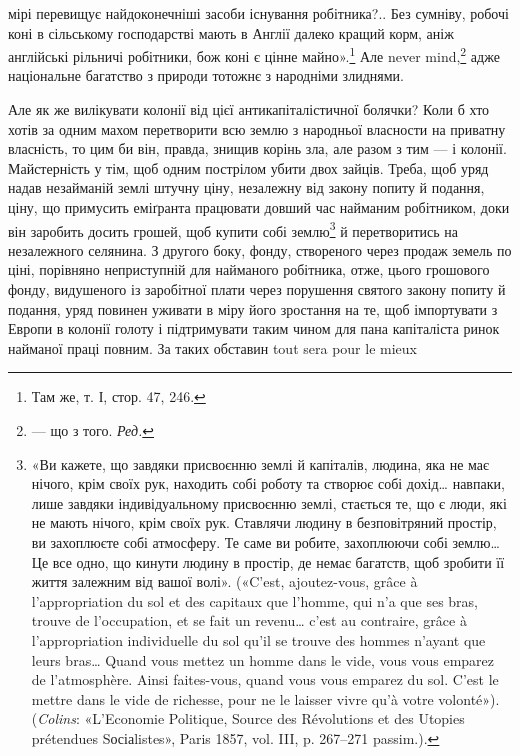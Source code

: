 \parcont{}  %
мірі перевищує найдоконечніші засоби існування робітника?.. Без сумніву, робочі коні в сільському
господарстві мають в Англії далеко кращий корм, аніж англійські рільничі робітники, бож коні є цінне
майно».\footnote{
Там же, т. І, стор. 47, 246.
} Але never mind,\footnote*{— що з того. \emph{Ред.}} адже національне багатство з природи тотожнє з народніми злиднями.

Але як же вилікувати колонії від цієї антикапіталістичної болячки? Коли б хто хотів за одним махом
перетворити всю землю з народньої власности на приватну власність, то цим би він, правда, знищив
корінь зла, але разом з тим — і колонії. Майстерність у тім, щоб одним пострілом убити двох зайців.
Треба, щоб уряд надав незайманій землі штучну ціну, незалежну від закону попиту й подання, ціну, що
примусить еміґранта
працювати довший час найманим робітником, доки він заробить досить грошей, щоб купити собі землю\footnote{
«Ви кажете, що завдяки присвоєнню землі й капіталів, людина, яка не має нічого, крім своїх рук,
находить собі роботу та створює собі дохід\dots{} навпаки, лише завдяки індивідуальному присвоєнню
землі, стається те, що є люди, які не мають нічого, крім своїх рук. Ставлячи людину в безповітряний
простір, ви захоплюєте собі атмосферу. Те саме ви робите, захоплюючи собі землю\dots{} Це все одно, що
кинути людину в простір, де немає багатств, щоб зробити її життя залежним від вашої волі». («C’est,
ajoutez-vous, grâce à l’appropriation du sol et des capitaux que l’homme, qui n’a que ses bras,
trouve de l’occupation, et se fait un revenu\dots{} c’est au contraire, grâce à l’appropriation
individuelle du
sol qu’il se trouve des hommes n’ayant que leurs bras\dots{} Quand vous mettez un homme dans le vide,
vous vous emparez de l’atmosphère. Ainsi faites-vous, quand vous vous emparez du sol. C’est le
mettre dans le vide de richesse, pour ne le laisser vivre qu’à votre volonté»). (\emph{Colins}: «L’Economie
Politique, Source des Révolutions et des Utopies prétendues Sосіаlistes», Paris 1857, vol. III, p.
267--271 passim.).
} й перетворитись на незалежного селянина. З другого боку, фонду, створеного через продаж земель по
ціні, порівняно неприступній для найманого робітника, отже, цього грошового фонду, видушеного із
заробітної плати через порушення святого закону попиту й подання, уряд повинен уживати в міру його
зростання на те, щоб імпортувати з Европи в колонії голоту і підтримувати таким
чином для пана капіталіста ринок найманої праці повним. За таких обставин tout sera pour le mieux
